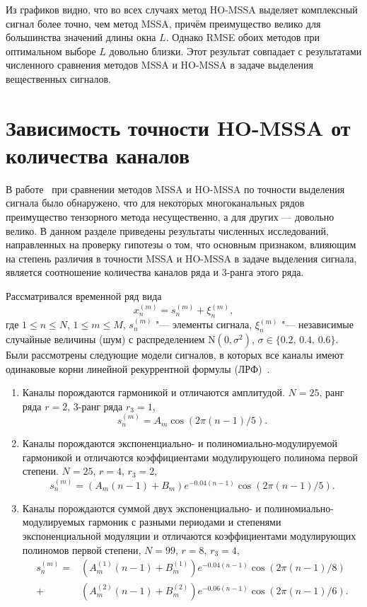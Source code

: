 \documentclass[specialist,
  substylefile = spbu.rtx,
subf,href,colorlinks=true, 12pt]{disser}
\theoremstyle{plain}
\theoremstyle{definition}
\theoremstyle{remark}
\begin{document}
Из графиков видно, что во всех случаях метод HO-MSSA выделяет
комплексный сигнал более точно, чем метод MSSA,
причём преимущество велико для большинства значений длины окна $L$.
Однако RMSE обоих методов при оптимальном выборе $L$ довольно близки.
Этот результат совпадает с результатами численного сравнения методов MSSA и
HO-MSSA в задаче выделения вещественных сигналов.

\section{Зависимость точности HO-MSSA от количества каналов}
\label{sec:r3-vs-channels}
В работе~\cite{Thesis2024} при сравнении методов MSSA и HO-MSSA по
точности выделения сигнала было обнаружено, что для некоторых
многоканальных рядов преимущество тензорного метода несущественно, а
для других --- довольно велико. В данном разделе приведены результаты
численных исследований, направленных на проверку гипотезы о том, что
основным признаком, влияющим на степень различия в точности MSSA и HO-MSSA в
задаче выделения сигнала, является соотношение количества каналов
ряда и 3-ранга этого ряда.

Рассматривался временной ряд вида
\begin{equation*}
  x_n^{(m)} = s_n^{(m)} + \xi_n^{(m)},
\end{equation*}
где $1 \leqslant n \leqslant N$, $1 \leqslant m \leqslant M$,
$s_n^{(m)}$ "--- элементы
сигнала, $\xi_n^{(m)}$ "--- независимые
случайные величины (шум) с распределением
$\mathrm{N}(0, \sigma^2)$, $\sigma \in \{0.2,\, 0.4,\, 0.6\}$.
Были рассмотрены следующие модели сигналов, в которых все каналы
имеют одинаковые корни линейной рекуррентной формулы (ЛРФ)~\cite{ssa}.
\begin{enumerate}
  \item Каналы порождаются гармоникой и отличаются
    амплитудой. $N = 25$, ранг ряда $r = 2$, 3-ранг ряда $r_3=1$,
    \label{enum:r3-amplitudes}
    \[
      s_n^{(m)} = A_m \cos (2 \pi (n - 1) / 5).
    \]
  \item Каналы порождаются экспоненциально- и
    полиномиально-модулируемой гармоникой и отличаются
    коэффициентами модулирующего полинома первой
    степени. $N = 25$, $r=4$, $r_3 = 2$,
    \label{enum:r3-poly}
    \[
      s_n^{(m)} = (A_m (n - 1) + B_m) e^{-0.04 (n - 1)}\cos (2 \pi
      (n - 1) / 5).
    \]
  \item Каналы порождаются суммой двух экспоненциально- и
    полиномиально-модулируемых гармоник с разными периодами и
    степенями экспоненциальной модуляции и отличаются
    коэффициентами модулирующих полиномов первой
    степени, $N=99$, $r = 8$, $r_3 = 4$,
    \label{enum:r3-poly-diff-freq}
    \begin{align*}
      s_n^{(m)} = &(A_m^{(1)} (n - 1) + B_m^{(1)}) e^{-0.04 (n -
      1)}\cos (2 \pi (n - 1) / 8)\\
      +& (A_m^{(2)} (n - 1) + B_m^{(2)})
      e^{-0.06 (n - 1)}\cos (2 \pi (n - 1) / 6).
    \end{align*}
\end{enumerate}
\end{document}
